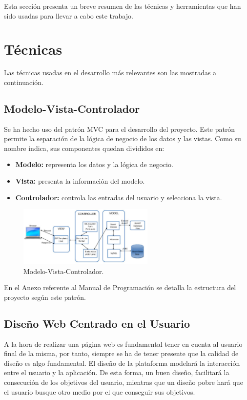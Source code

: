 
Esta sección presenta un breve resumen de las técnicas y herramientas que han sido usadas para llevar a cabo este trabajo.

\section{Técnicas}

Las técnicas usadas en el desarrollo más relevantes son las mostradas a continuación.

\subsection{Modelo-Vista-Controlador}
Se ha hecho uso del patrón MVC para el desarrollo del proyecto. Este patrón permite la separación de la lógica de negocio de los datos y las vistas. Como su nombre indica, sus componentes quedan divididos en:

\begin{itemize}
	\item \textbf{Modelo:} representa los datos y la lógica de negocio.
	\item \textbf{Vista:} presenta la información del modelo.
	\item \textbf{Controlador:} controla las entradas del usuario y selecciona la vista.
\end{itemize}

\begin{figure}[h]
  \centering
    \includegraphics[width=0.6\textwidth]{../img/diagramas/mvc.png}
  \caption{Modelo-Vista-Controlador.}
  \label{ciclo}
\end{figure}

En el Anexo referente al Manual de Programación se detalla la estructura del proyecto según este patrón.

\subsection{Diseño Web Centrado en el Usuario}

A la hora de realizar una página web es fundamental tener en cuenta al usuario final de la misma, por tanto, siempre se ha de tener presente que la calidad de diseño es algo fundamental. El diseño de la plataforma modelará la interacción entre el usuario y la aplicación. De esta forma, un buen diseño, facilitará la consecución de los objetivos del usuario, mientras que un diseño pobre hará que el usuario busque otro medio por el que conseguir sus objetivos.

